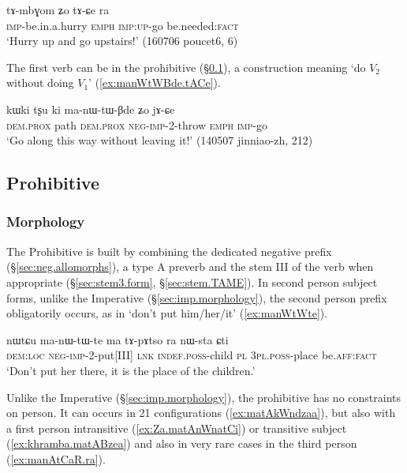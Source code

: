 \begin{exe}
\ex  \label{ex:tAmbGom.tACe}
\gll tɤ-mbɣom ʑo tɤ-ɕe ra\\
\textsc{imp}-be.in.a.hurry \textsc{emph} \textsc{imp}:\textsc{up}-go be.needed:\textsc{fact} \\
\glt `Hurry up and go upstairs!' (160706 poucet6, 6)
\end{exe}

The first verb can be in the prohibitive (§\ref{sec:prohibitive}), a construction meaning `do $V_2$ without doing $V_1$' (\ref{ex:manWtWBde.tACe}).

\begin{exe}
\ex  \label{ex:manWtWBde.tACe}
\gll kɯki tʂu ki ma-nɯ-tɯ-βde ʑo jɤ-ɕe \\
\textsc{dem}.\textsc{prox} path \textsc{dem}.\textsc{prox} \textsc{neg}-\textsc{imp}-2-throw \textsc{emph} \textsc{imp}-go \\
\glt `Go along this way without leaving it!' (140507 jinniao-zh, 212)
\end{exe}

\subsection{Prohibitive} \label{sec:prohibitive}
 
\subsubsection{Morphology} \label{sec:prohibitive.morpho}
The Prohibitive is built by combining the dedicated negative prefix  (§\ref{sec:neg.allomorphs}), a type A preverb and the stem III of the verb when appropriate (§\ref{sec:stem3.form}, §\ref{sec:stem.TAME}). In second person subject forms, unlike the Imperative (§\ref{sec:imp.morphology}), the second person prefix obligatorily occurs, as in  `don't put him/her/it' (\ref{ex:manWtWte}).

\begin{exe}
\ex  \label{ex:manWtWte}
\gll nɯtɕu ma-nɯ-tɯ-te ma tɤ-pɤtso ra nɯ-sta ɕti \\
\textsc{dem}:\textsc{loc} \textsc{neg}-\textsc{imp}-2-put[III] \textsc{lnk} \textsc{indef}.\textsc{poss}-child \textsc{pl} \textsc{3pl}.\textsc{poss}-place be.\textsc{aff}:\textsc{fact} \\
\glt `Don't put her there, it is the place of the children.' 
\end{exe}


Unlike the Imperative (§\ref{sec:imp.morphology}), the prohibitive has no constraints on person. It can occurs in 2\fl{}1 configurations (\ref{ex:matAkWndzaa}), but also with a first person intransitive (\ref{ex:Za.matAnWnatCi}) or transitive subject (\ref{ex:khramba.matABzea}) and also in very rare cases in the third person (\ref{ex:manAtCaR.ra}).

